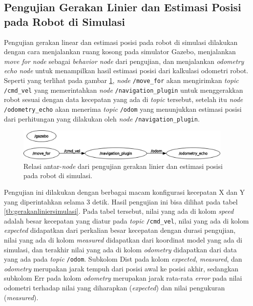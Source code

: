 \subsection{Pengujian Gerakan Linier dan Estimasi Posisi pada Robot di Simulasi}
\label{subsec:liniersimulasi}

Pengujian gerakan linear dan estimasi posisi pada robot di simulasi dilakukan dengan cara menjalankan ruang kosong pada simulator Gazebo,
  menjalankan \emph{move for node} sebagai \emph{behavior node} dari pengujian,
  dan menjalankan \emph{odometry echo node} untuk menampilkan hasil estimasi posisi dari kalkulasi odometri robot.
Seperti yang terlihat pada gambar \ref{fig:rosgraphnavigationplugin},
  \emph{node} \lstinline{/move_for} akan mengirimkan \emph{topic} \lstinline{/cmd_vel} yang memerintahkan \emph{node} \lstinline{/navigation_plugin} untuk menggerakkan robot sesuai dengan data kecepatan yang ada di \emph{topic} tersebut,
  setelah itu \emph{node} \lstinline{/odometry_echo} akan menerima \emph{topic} \lstinline{/odom} yang menunjukkan estimasi posisi dari perhitungan yang dilakukan oleh \emph{node} \lstinline{/navigation_plugin}.

\begin{figure}[ht]
  \centering
  \includegraphics[width=0.95\textwidth,keepaspectratio]{gambar/rosgraph-navigation-plugin.png}
  \caption{Relasi antar-\emph{node} dari pengujian gerakan linier dan estimasi posisi pada robot di simulasi.}
  \label{fig:rosgraphnavigationplugin}
\end{figure}



Pengujian ini dilakukan dengan berbagai macam konfigurasi kecepatan X dan Y yang diperintahkan selama 3 detik.
Hasil pengujian ini bisa dilihat pada tabel \ref{tb:gerakanliniersimulasi}.
Pada tabel tersebut, nilai yang ada di kolom \emph{speed} adalah besar kecepatan yang diatur pada \emph{topic} \lstinline{/cmd_vel},
  nilai yang ada di kolom \emph{expected} didapatkan dari perkalian besar kecepatan dengan durasi pengujian,
  nilai yang ada di kolom \emph{measured} didapatkan dari koordinat model yang ada di simulasi,
  dan terakhir nilai yang ada di kolom \emph{odometry} didapatkan dari data yang ada pada \emph{topic} \lstinline{/odom}.
Subkolom Dist pada kolom \emph{expected}, \emph{measured}, dan \emph{odometry} merupakan jarak tempuh dari posisi awal ke posisi akhir,
  sedangkan subkolom Err pada kolom \emph{odometry} merupakan jarak rata-rata \emph{error} pada nilai odometri terhadap nilai yang diharapkan (\emph{expected}) dan nilai pengukuran (\emph{measured}).

